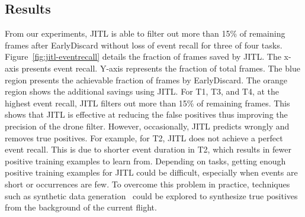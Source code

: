 \subsection{Results}

From our experiments, JITL is able to filter out more than 15\% of remaining
frames after EarlyDiscard without loss of event recall for three of four tasks.
Figure~\ref{fig:jitl-eventrecall} details the fraction of frames saved by JITL.
The x-axis presents event recall. Y-axis represents the fraction of total
frames. The blue region presents the achievable fraction of frames by
EarlyDiscard. The orange region shows the additional savings using JITL. For T1,
T3, and T4, at the highest event recall, JITL filters out more than 15\% of
remaining frames. This shows that JITL is effective at reducing the false
positives thus improving the precision of the drone filter. However,
occasionally, JITL predicts wrongly and removes true positives. For example, for
T2, JITL does not achieve a perfect event recall. This is due to shorter event
duration in T2, which results in fewer positive training examples to learn
from. Depending on tasks, getting enough positive training examples for JITL
could be difficult, especially when events are short or occurrences are few. To
overcome this problem in practice, techniques such as synthetic data
generation~\cite{Dwibedi2017} could be explored to synthesize true positives
from the background of the current flight.
